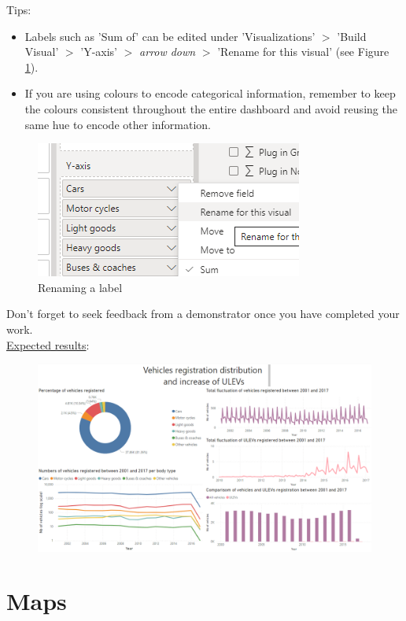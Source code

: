 \documentclass[11pt]{article}
\begin{document}
Tips:
\begin{itemize}
    \item Labels such as 'Sum of' can be edited under 'Visualizations' $>$ 'Build Visual' $>$ 'Y-axis' $>$ \textit{arrow down} $>$ 'Rename for this visual' (see Figure \ref{fig:rename}).
    \item If you are using colours to encode categorical information, remember to keep the colours consistent throughout the entire dashboard and avoid reusing the same hue to encode other information.
\end{itemize}

\begin{figure}[h!]
    \centering
    \includegraphics[width=.4\linewidth]{img/rename.png}
    \caption{Renaming a label}
    \label{fig:rename}
\end{figure}

Don't forget to seek feedback from a demonstrator once you have completed your work.\\

\underline{Expected results}:

\begin{figure}[h!]
    \centering
    \includegraphics[width=\linewidth]{img/overallCar.png}
\end{figure}

\clearpage

\section{Maps}
\end{document}
